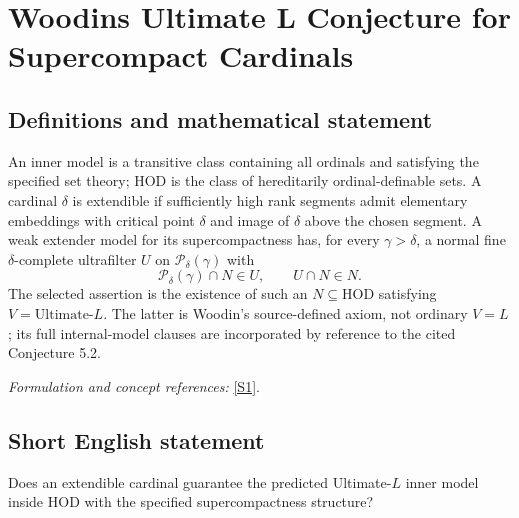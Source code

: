 \documentclass[11pt]{article}
\begin{document}
\section*{\texorpdfstring{Woodins Ultimate L Conjecture for Supercompact Cardinals}{Woodins Ultimate L Conjecture for Supercompact Cardinals}}\label{statement}
\subsection{Definitions and mathematical statement}
An inner model is a transitive class containing all ordinals and satisfying the specified set theory; $\mathrm{HOD}$ is the class of hereditarily ordinal-definable sets. A cardinal $\delta$ is extendible if sufficiently high rank segments admit elementary embeddings with critical point $\delta$ and image of $\delta$ above the chosen segment. A weak extender model for its supercompactness has, for every $\gamma>\delta$, a normal fine $\delta$-complete ultrafilter $U$ on $\mathcal P_\delta(\gamma)$ with
\[
 \mathcal P_\delta(\gamma)\cap N\in U,\qquad U\cap N\in N.
\]
The selected assertion is the existence of such an $N\subseteq\mathrm{HOD}$ satisfying $V=\mathrm{Ultimate}\text{-}L$. The latter is Woodin's source-defined axiom, not ordinary $V=L$; its full internal-model clauses are incorporated by reference to the cited Conjecture 5.2.
\par\smallskip\textit{Formulation and concept references:} \href{https://www.cambridge.org/core/journals/review-of-symbolic-logic/article/steels-programme-evidential-framework-the-core-and-ultimatel/22BC5068C2DC48CC899C60E1445A7792}{[S1]}.

\subsection{Short English statement}
Does an extendible cardinal guarantee the predicted Ultimate-$L$ inner model inside HOD with the specified supercompactness structure?
\end{document}
